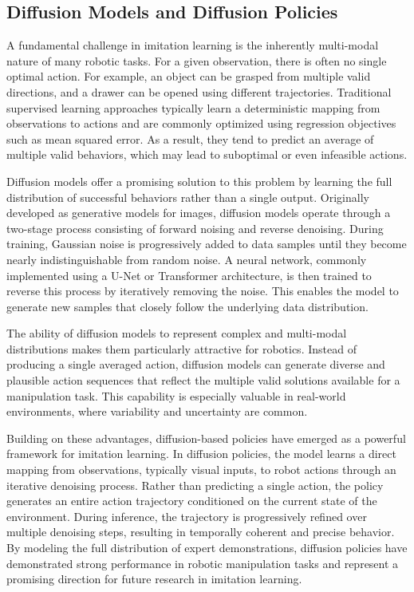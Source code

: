 \subsection{Diffusion Models and Diffusion Policies}

A fundamental challenge in imitation learning is the inherently multi-modal nature of many robotic tasks. For a given observation, there is often no single optimal action. For example, an object can be grasped from multiple valid directions, and a drawer can be opened using different trajectories. Traditional supervised learning approaches typically learn a deterministic mapping from observations to actions and are commonly optimized using regression objectives such as mean squared error. As a result, they tend to predict an average of multiple valid behaviors, which may lead to suboptimal or even infeasible actions.

Diffusion models offer a promising solution to this problem by learning the full distribution of successful behaviors rather than a single output. Originally developed as generative models for images, diffusion models operate through a two-stage process consisting of forward noising and reverse denoising. During training, Gaussian noise is progressively added to data samples until they become nearly indistinguishable from random noise. A neural network, commonly implemented using a U-Net or Transformer architecture, is then trained to reverse this process by iteratively removing the noise. This enables the model to generate new samples that closely follow the underlying data distribution.

The ability of diffusion models to represent complex and multi-modal distributions makes them particularly attractive for robotics. Instead of producing a single averaged action, diffusion models can generate diverse and plausible action sequences that reflect the multiple valid solutions available for a manipulation task. This capability is especially valuable in real-world environments, where variability and uncertainty are common.

Building on these advantages, diffusion-based policies have emerged as a powerful framework for imitation learning. In diffusion policies, the model learns a direct mapping from observations, typically visual inputs, to robot actions through an iterative denoising process. Rather than predicting a single action, the policy generates an entire action trajectory conditioned on the current state of the environment. During inference, the trajectory is progressively refined over multiple denoising steps, resulting in temporally coherent and precise behavior. By modeling the full distribution of expert demonstrations, diffusion policies have demonstrated strong performance in robotic manipulation tasks and represent a promising direction for future research in imitation learning.
